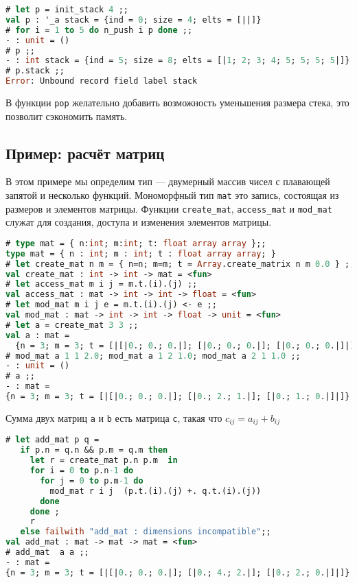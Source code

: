 \begin{lstlisting}[language=OCaml]
# let p = init_stack 4 ;;
val p : '_a stack = {ind = 0; size = 4; elts = [||]}
# for i = 1 to 5 do n_push i p done ;;
- : unit = ()
# p ;;
- : int stack = {ind = 5; size = 8; elts = [|1; 2; 3; 4; 5; 5; 5; 5|]}
# p.stack ;;
Error: Unbound record field label stack
\end{lstlisting}

В функции \texttt{pop} желательно добавить возможность уменьшения размера стека,
это позволит сэкономить память.

\subsection{Пример: расчёт матриц}
\label{subsec:example_Calculations on Matrices}

В этом примере мы определим тип  --- двумерный массив чисел с
плавающей запятой и несколько функций. Мономорфный тип \texttt{mat} это запись,
состоящая из размеров и элементов матрицы. Функции \texttt{create\_mat},
\texttt{access\_mat} и \texttt{mod\_mat} служат для создания, доступа и
изменения элементов матрицы.

\begin{lstlisting}[language=OCaml]
# type mat = { n:int; m:int; t: float array array };;
type mat = { n : int; m : int; t : float array array; }
# let create_mat n m = { n=n; m=m; t = Array.create_matrix n m 0.0 } ;;
val create_mat : int -> int -> mat = <fun>
# let access_mat m i j = m.t.(i).(j) ;;
val access_mat : mat -> int -> int -> float = <fun>
# let mod_mat m i j e = m.t.(i).(j) <- e ;;
val mod_mat : mat -> int -> int -> float -> unit = <fun>
# let a = create_mat 3 3 ;;
val a : mat =
  {n = 3; m = 3; t = [|[|0.; 0.; 0.|]; [|0.; 0.; 0.|]; [|0.; 0.; 0.|]|]}
# mod_mat a 1 1 2.0; mod_mat a 1 2 1.0; mod_mat a 2 1 1.0 ;;
- : unit = ()
# a ;;
- : mat =
{n = 3; m = 3; t = [|[|0.; 0.; 0.|]; [|0.; 2.; 1.|]; [|0.; 1.; 0.|]|]}
\end{lstlisting}

Сумма двух матриц \texttt{a} и \texttt{b} есть матрица \texttt{c}, такая что $
c_{ij} = a_{ij} + b_{ij} $

\begin{lstlisting}[language=OCaml]
# let add_mat p q =
   if p.n = q.n && p.m = q.m then
     let r = create_mat p.n p.m  in
     for i = 0 to p.n-1 do
       for j = 0 to p.m-1 do
         mod_mat r i j  (p.t.(i).(j) +. q.t.(i).(j))
       done
     done ;
     r
   else failwith "add_mat : dimensions incompatible";;
val add_mat : mat -> mat -> mat = <fun>
# add_mat  a a ;;
- : mat =
{n = 3; m = 3; t = [|[|0.; 0.; 0.|]; [|0.; 4.; 2.|]; [|0.; 2.; 0.|]|]}
\end{lstlisting}

